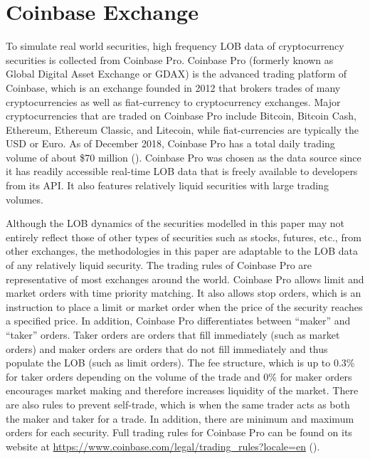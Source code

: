 \section{Coinbase Exchange}

To simulate real world securities, high frequency LOB data of cryptocurrency securities is collected from Coinbase Pro. Coinbase Pro (formerly known as Global Digital Asset Exchange or GDAX) is the advanced trading platform of Coinbase, which is an exchange founded in 2012 that brokers trades of many cryptocurrencies as well as fiat-currency to cryptocurrency exchanges. Major cryptocurrencies that are traded on Coinbase Pro include Bitcoin, Bitcoin Cash, Ethereum, Ethereum Classic, and Litecoin, while fiat-currencies are typically the USD or Euro. As of December 2018, Coinbase Pro has a total daily trading volume of about \$70 million (\cite{L1}). Coinbase Pro was chosen as the data source since it has readily accessible real-time LOB data that is freely available to developers from its API. It also features relatively liquid securities with large trading volumes. 

Although the LOB dynamics of the securities modelled in this paper may not entirely reflect those of other types of securities such as stocks, futures, etc., from other exchanges, the methodologies in this paper are adaptable to the LOB data of any relatively liquid security. The trading rules of Coinbase Pro are representative of most exchanges around the world. Coinbase Pro allows limit and market orders with time priority matching. It also allows stop orders, which is an instruction to place a limit or market order when the price of the security reaches a specified price. In addition, Coinbase Pro differentiates between “maker” and “taker” orders. Taker orders are orders that fill immediately (such as market orders) and maker orders are orders that do not fill immediately and thus populate the LOB (such as limit orders). The fee structure, which is up to 0.3\% for taker orders depending on the volume of the trade and 0\% for maker orders encourages market making and therefore increases liquidity of the market. There are also rules to prevent self-trade, which is when the same trader acts as both the maker and taker for a trade. In addition, there are minimum and maximum orders for each security. Full trading rules for Coinbase Pro can be found on its website at \url{https://www.coinbase.com/legal/trading_rules?locale=en} (\cite{L2}).

